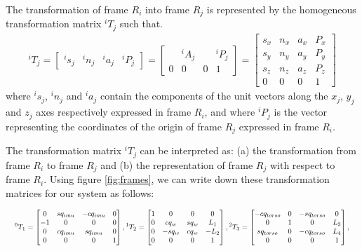 \documentclass[a4paper,10pt]{article}
\newcommand\scalemath[2]{\scalebox{#1}{\mbox{\ensuremath{\displaystyle #2}}}}
\begin{document}
The transformation of frame $R_i$ into frame $R_j$ is represented by the homogeneous transformation matrix
${}^{i}T_j$ such that.
\begin{align}
 {}^{i}T_j = \left[\begin{matrix}{}^{i}s_j & {}^{i}n_j & {}^{i}a_j & {}^{i}P_j \end{matrix} \right] 
  = \left[\begin{matrix} & {}^iA_j & & {}^iP_j \\ 0 & 0 & 0 & 1 \end{matrix}\right]
  = \left[\begin{matrix}s_x & n_x & a_x & P_x  \\ s_y & n_y & a_y & P_y 
  \\ s_z & n_z & a_z & P_z \\ 0 & 0 & 0 & 1 \end{matrix} \right]
\end{align}
where ${}^is_j$, ${}^in_j$ and ${}^ia_j$ contain the components of the unit vectors along the $x_j$, 
$y_j$ and $z_j$ axes respectively expressed in frame $R_i$, and where ${}^iP_j$ is the vector representing
the coordinates of the origin of frame $R_j$ expressed in frame $R_i$.

The transformation matrix ${}^iT_j$ can be interpreted as: (a) the transformation from frame $R_i$ to frame $R_j$
and (b) the representation of frame $R_j$ with respect to frame $R_i$. Using figure \ref{fig:frames}, we can
write down these transformation matrices for our system as follows:

\[
 \scalemath{0.75}{{}^0T_1 = \left[\begin{matrix} 0 & sq_{imu} & -cq_{imu} & 0 \\ -1 & 0 & 0 & 0 \\ 0 & cq_{imu} & sq_{imu} & 0 \\ 0 & 0 & 0 & 1 \end{matrix}\right],
 {}^1T_2 = \left[\begin{matrix} 1 & 0 & 0 & 0 \\ 0 & cq_w & sq_w & L_1 \\ 0 & -sq_w & cq_w & -L_2 \\ 0 & 0 & 0 & 1 \end{matrix}\right], 
 {}^2T_3 = \left[\begin{matrix} -cq_{torso} & 0 & -sq_{torso} & 0 \\ 0 & 1 & 0 & L_3 \\ sq_{torso} & 0 & -cq_{torso} & L_4 \\ 0 & 0 & 0 & 1 \end{matrix}\right],}
\]
\end{document}
